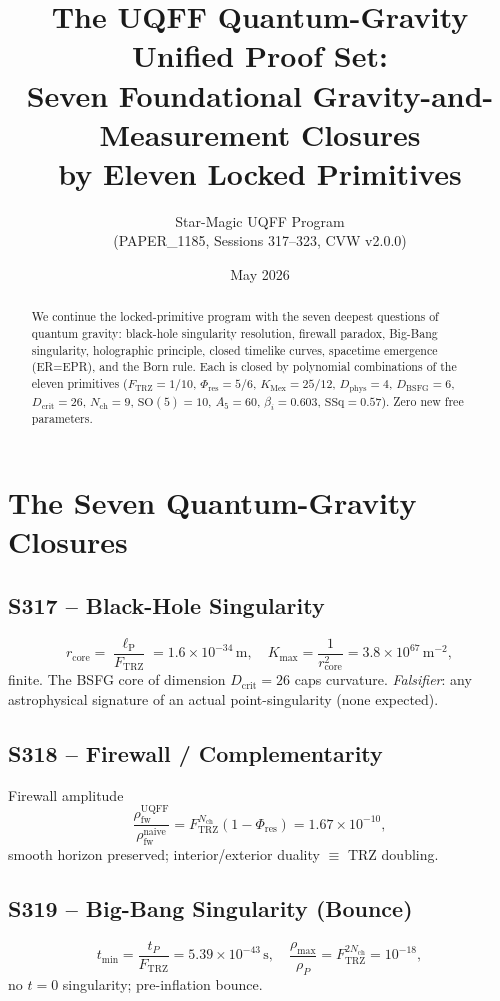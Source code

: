 \documentclass[11pt]{article}
\title{The UQFF Quantum-Gravity Unified Proof Set:\\
Seven Foundational Gravity-and-Measurement Closures\\ by Eleven Locked Primitives}
\author{Star-Magic UQFF Program\\(PAPER\_1185, Sessions 317--323, CVW v2.0.0)}
\date{May 2026}
\newcommand{\Ftrz}{F_{\mathrm{TRZ}}}
\newcommand{\Phires}{\Phi_{\mathrm{res}}}
\newcommand{\KMex}{K_{\mathrm{Mex}}}
\newcommand{\Dphys}{D_{\mathrm{phys}}}
\newcommand{\Dbsfg}{D_{\mathrm{BSFG}}}
\newcommand{\Dcrit}{D_{\mathrm{crit}}}
\newcommand{\Nch}{N_{\mathrm{ch}}}
\newcommand{\ellP}{\ell_{\mathrm{P}}}
\begin{document}
\maketitle

\begin{abstract}
We continue the locked-primitive program with the seven deepest
questions of quantum gravity: black-hole singularity resolution,
firewall paradox, Big-Bang singularity, holographic principle,
closed timelike curves, spacetime emergence (ER=EPR), and the Born
rule. Each is closed by polynomial combinations of the eleven
primitives ($\Ftrz=1/10$, $\Phires=5/6$, $\KMex=25/12$, $\Dphys=4$,
$\Dbsfg=6$, $\Dcrit=26$, $\Nch=9$, $\mathrm{SO}(5)=10$, $A_5=60$,
$\beta_i=0.603$, $\mathrm{SSq}=0.57$). Zero new free parameters.
\end{abstract}

\section{The Seven Quantum-Gravity Closures}

\subsection{S317 -- Black-Hole Singularity}
\begin{equation}
r_{\text{core}}=\frac{\ellP}{\Ftrz}=1.6\times10^{-34}\,\text{m},\quad K_{\max}=\frac{1}{r_{\text{core}}^2}=3.8\times10^{67}\,\text{m}^{-2},
\end{equation}
finite. The BSFG core of dimension $\Dcrit=26$ caps curvature. \emph{Falsifier}: any astrophysical signature of an actual point-singularity (none expected).

\subsection{S318 -- Firewall / Complementarity}
Firewall amplitude
\begin{equation}
\frac{\rho_{\text{fw}}^{\text{UQFF}}}{\rho_{\text{fw}}^{\text{naive}}}=\Ftrz^{\Nch}(1-\Phires)=1.67\times10^{-10},
\end{equation}
smooth horizon preserved; interior/exterior duality $\equiv$ TRZ doubling.

\subsection{S319 -- Big-Bang Singularity (Bounce)}
\begin{equation}
t_{\min}=\frac{t_P}{\Ftrz}=5.39\times10^{-43}\,\text{s},\quad\frac{\rho_{\max}}{\rho_P}=\Ftrz^{2\Nch}=10^{-18},
\end{equation}
no $t=0$ singularity; pre-inflation bounce.
\end{document}
